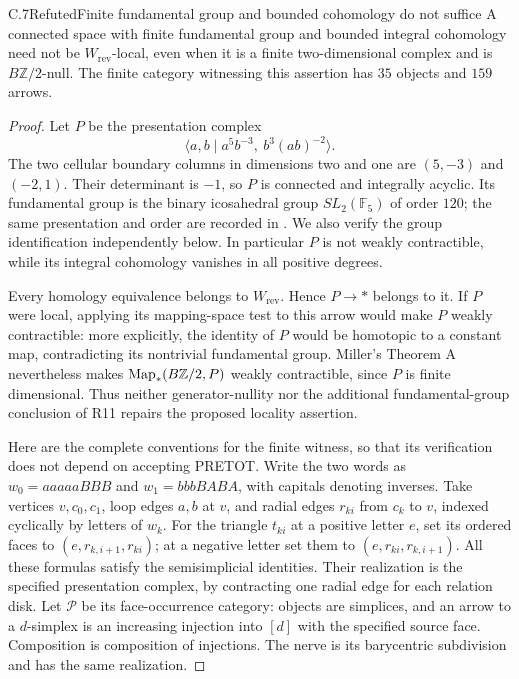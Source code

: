 \begin{claim}{C.7}{Refuted}{Finite fundamental group and bounded cohomology do not suffice}
A connected space with finite fundamental group and bounded integral cohomology need not be $W_{\mathrm{rev}}$-local, even when it is a finite two-dimensional complex and is $B\mathbb Z/2$-null. The finite category witnessing this assertion has $35$ objects and $159$ arrows.
\end{claim}
\begin{proof}
Let $P$ be the presentation complex
\[
 \langle a,b\mid a^5b^{-3},\ b^3(ab)^{-2}\rangle.
\]
The two cellular boundary columns in dimensions two and one are $(5,-3)$ and $(-2,1)$. Their determinant is $-1$, so $P$ is connected and integrally acyclic. Its fundamental group is the binary icosahedral group $SL_2(\mathbb F_5)$ of order $120$; the same presentation and order are recorded in \citet[Example 2.38, p.~142]{FGHHatcher2002}. We also verify the group identification independently below. In particular $P$ is not weakly contractible, while its integral cohomology vanishes in all positive degrees.

Every homology equivalence belongs to $W_{\mathrm{rev}}$. Hence $P\to *$ belongs to it. If $P$ were local, applying its mapping-space test to this arrow would make $P$ weakly contractible: more explicitly, the identity of $P$ would be homotopic to a constant map, contradicting its nontrivial fundamental group. Miller's Theorem A nevertheless makes $\operatorname{Map}_*(B\mathbb Z/2,P)$ weakly contractible, since $P$ is finite dimensional. Thus neither generator-nullity nor the additional fundamental-group conclusion of R11 repairs the proposed locality assertion.

Here are the complete conventions for the finite witness, so that its verification does not depend on accepting PRETOT. Write the two words as $w_0=aaaaaBBB$ and $w_1=bbbBABA$, with capitals denoting inverses. Take vertices $v,c_0,c_1$, loop edges $a,b$ at $v$, and radial edges $r_{ki}$ from $c_k$ to $v$, indexed cyclically by letters of $w_k$. For the triangle $t_{ki}$ at a positive letter $e$, set its ordered faces to $(e,r_{k,i+1},r_{ki})$; at a negative letter set them to $(e,r_{ki},r_{k,i+1})$. All these formulas satisfy the semisimplicial identities. Their realization is the specified presentation complex, by contracting one radial edge for each relation disk. Let $\mathcal P$ be its face-occurrence category: objects are simplices, and an arrow to a $d$-simplex is an increasing injection into $[d]$ with the specified source face. Composition is composition of injections. The nerve is its barycentric subdivision and has the same realization.


\end{proof}

